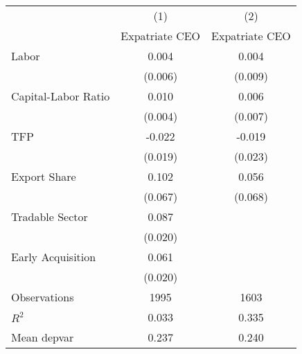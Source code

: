 \begin{tabular}{l*{2}{c}}
\hline\hline
                    &\multicolumn{1}{c}{(1)}&\multicolumn{1}{c}{(2)}\\
                    &\multicolumn{1}{c}{Expatriate CEO}&\multicolumn{1}{c}{Expatriate CEO}\\
\hline
Labor               &       0.004&       0.004\\
                    &     (0.006)&     (0.009)\\
[1em]
Capital-Labor Ratio &       0.010&       0.006\\
                    &     (0.004)&     (0.007)\\
[1em]
TFP                 &      -0.022&      -0.019\\
                    &     (0.019)&     (0.023)\\
[1em]
Export Share        &       0.102&       0.056\\
                    &     (0.067)&     (0.068)\\
[1em]
Tradable Sector     &       0.087&            \\
                    &     (0.020)&            \\
[1em]
Early Acquisition   &       0.061&            \\
                    &     (0.020)&            \\
\hline
Observations        &        1995&        1603\\
\(R^{2}\)           &       0.033&       0.335\\
Mean depvar         &       0.237&       0.240\\
\hline\hline
\end{tabular}
